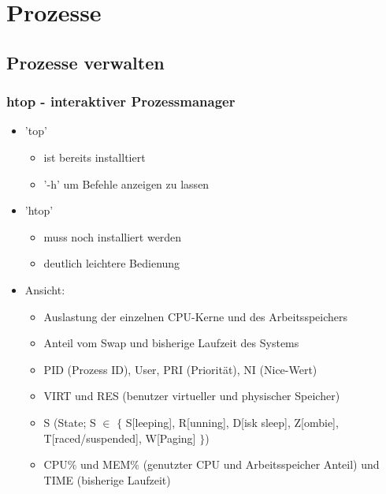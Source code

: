 \documentclass[12pt,utf8]{beamer}
\begin{document}
\section{Prozesse}
\subsection{Prozesse verwalten}
\begin{frame}
\frametitle{htop - interaktiver Prozessmanager}
\begin{itemize}
	\item 'top'
	\begin{itemize}[<+->]
		\item ist bereits installtiert
		\item '-h' um Befehle anzeigen zu lassen
	\end{itemize}
	\item 'htop'
	\begin{itemize}[<+->]
		\item muss noch installiert werden
		\item deutlich leichtere Bedienung
	\end{itemize}
	\item Ansicht:
	\begin{itemize}[<+->]
		\item Auslastung der einzelnen CPU-Kerne und des Arbeitsspeichers
		\item Anteil vom Swap und bisherige Laufzeit des Systems
		\item PID (Prozess ID), User, PRI (Priorität), NI (Nice-Wert)
		\item VIRT und RES (benutzer virtueller und physischer Speicher)
		\item S (State; S $\in$ $\{$ S[leeping], R[unning], D[isk sleep], Z[ombie], T[raced/suspended], W[Paging] $\}$)
		\item CPU$\%$ und MEM$\%$ (genutzter CPU und Arbeitsspeicher Anteil) und TIME (bisherige Laufzeit)
	\end{itemize}
\end{itemize}
\end{frame}
\end{document}
